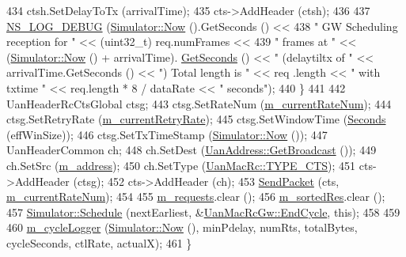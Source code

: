 \begin{DoxyCode}
434       ctsh.SetDelayToTx (arrivalTime);
435       cts->AddHeader (ctsh);
436 
437       \hyperlink{group__logging_ga413f1886406d49f59a6a0a89b77b4d0a}{NS\_LOG\_DEBUG} (\hyperlink{classns3_1_1Simulator_ac3178fa975b419f7875e7105be122800}{Simulator::Now} ().GetSeconds () <<
438                     \textcolor{stringliteral}{" GW Scheduling reception for "} << (uint32\_t) req.numFrames <<
439                     \textcolor{stringliteral}{" frames at "} << (\hyperlink{classns3_1_1Simulator_ac3178fa975b419f7875e7105be122800}{Simulator::Now} () + arrivalTime).
      \hyperlink{classns3_1_1Time_a8f20d5c3b0902d7b4320982f340b57c8}{GetSeconds} () << \textcolor{stringliteral}{"  (delaytiltx of "} << arrivalTime.GetSeconds () << \textcolor{stringliteral}{")  Total length is "} << req
      .length << \textcolor{stringliteral}{" with txtime "} << req.length * 8 / dataRate << \textcolor{stringliteral}{" seconds"});
440     \}
441 
442   UanHeaderRcCtsGlobal ctsg;
443   ctsg.SetRateNum (\hyperlink{classns3_1_1UanMacRcGw_ab0db1dee5adabd42e325e8c02937e3f7}{m\_currentRateNum});
444   ctsg.SetRetryRate (\hyperlink{classns3_1_1UanMacRcGw_a1fa6713bb1e860c9555ff7a3b7a082c3}{m\_currentRetryRate});
445   ctsg.SetWindowTime (\hyperlink{group__timecivil_ga33c34b816f8ff6628e33d5c8e9713b9e}{Seconds} (effWinSize));
446   ctsg.SetTxTimeStamp (\hyperlink{classns3_1_1Simulator_ac3178fa975b419f7875e7105be122800}{Simulator::Now} ());
447   UanHeaderCommon ch;
448   ch.SetDest (\hyperlink{classns3_1_1UanAddress_ad3b8c69e1408b20f0536a95d70ccbeda}{UanAddress::GetBroadcast} ());
449   ch.SetSrc (\hyperlink{classns3_1_1UanMacRcGw_aca721ba2f63161e937d0f856f4a566a0}{m\_address});
450   ch.SetType (\hyperlink{classns3_1_1UanMacRc_ad12bbd636f03943095e1c81cd1cc24b3a6c74a18f3ef5f623c1301ed43d64eaa6}{UanMacRc::TYPE\_CTS});
451   cts->AddHeader (ctsg);
452   cts->AddHeader (ch);
453   \hyperlink{classns3_1_1UanMacRcGw_a0e3aefc24d4dffd594008152ba63269c}{SendPacket} (cts, \hyperlink{classns3_1_1UanMacRcGw_ab0db1dee5adabd42e325e8c02937e3f7}{m\_currentRateNum});
454 
455   \hyperlink{classns3_1_1UanMacRcGw_ace02d765d83abd8ea6513fd7813626e0}{m\_requests}.clear ();
456   \hyperlink{classns3_1_1UanMacRcGw_afe8430ebad788663b695fe54593f5fcf}{m\_sortedRes}.clear ();
457   \hyperlink{classns3_1_1Simulator_a671882c894a08af4a5e91181bf1eec13}{Simulator::Schedule} (nextEarliest, &\hyperlink{classns3_1_1UanMacRcGw_afd7577179828a6dd31e59427f3c98672}{UanMacRcGw::EndCycle}, \textcolor{keyword}{this});
458 
459 
460   \hyperlink{classns3_1_1UanMacRcGw_a4c743f84c92dcc29b476cfd229d68dd8}{m\_cycleLogger} (\hyperlink{classns3_1_1Simulator_ac3178fa975b419f7875e7105be122800}{Simulator::Now} (), minPdelay, numRts, totalBytes, cycleSeconds,
       ctlRate, actualX);
461 \}
\end{DoxyCode}


